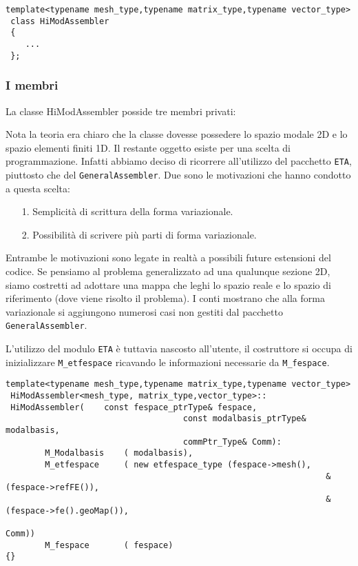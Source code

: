  \begin{lstlisting}[style = general]
 template<typename mesh_type,typename matrix_type,typename vector_type>
 class HiModAssembler
 {
	... 
 };
 \end{lstlisting}
 
\subsubsection{I membri}
La classe HiModAssembler posside tre membri privati:


Nota la teoria era chiaro che la classe dovesse possedere lo spazio modale 2D e lo spazio elementi finiti 1D.
Il restante oggetto esiste per una scelta di programmazione. Infatti abbiamo deciso di ricorrere all'utilizzo del pacchetto \texttt{ETA}, 
piuttosto che del \texttt{GeneralAssembler}. Due sono le motivazioni che hanno condotto a questa scelta:
\begin{itemize}
\item[1.] Semplicit\`a di scrittura della forma variazionale.
\item[2.] Possibilit\`a di scrivere pi\`u parti di forma variazionale.
\end{itemize}

Entrambe le motivazioni sono legate in realt\`a a possibili future estensioni del codice. Se pensiamo al problema generalizzato ad una qualunque 
sezione 2D, siamo costretti ad adottare una mappa che leghi lo spazio reale e lo spazio di riferimento (dove viene risolto il problema). I conti 
mostrano che alla forma variazionale si aggiungono numerosi casi non gestiti dal pacchetto \texttt{GeneralAssembler}.

L'utilizzo del modulo \texttt{ETA} \`e tuttavia nascosto all'utente, il costruttore si occupa di inizializzare \texttt{M\_etfespace} ricavando 
le informazioni necessarie da \texttt{M\_fespace}.

\begin{lstlisting}[style=general]
 template<typename mesh_type,typename matrix_type,typename vector_type>
 HiModAssembler<mesh_type, matrix_type,vector_type>::
 HiModAssembler(	const fespace_ptrType& fespace,
 									const modalbasis_ptrType& modalbasis,
 									commPtr_Type& Comm):
 		M_Modalbasis	( modalbasis),
 		M_etfespace 	( new etfespace_type (fespace->mesh(),
 																 &(fespace->refFE()),
 																 &(fespace->fe().geoMap()),
 																 Comm))
		M_fespace		( fespace)
{} 																 
 																
\end{lstlisting}

